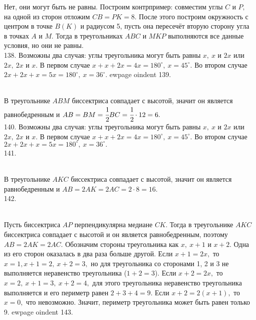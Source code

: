 Нет, они могут быть не равны. Построим контрпример: совместим углы $C$ и $P,$ на одной из сторон отложим $CB=PK=8.$ После этого построим окружность с центром в точке $B(K)$ и радиусом 5, пусть она пересечёт вторую сторону угла в точках $A$ и $M.$ Тогда в треугольниках $ABC$ и $MKP$ выполняются все данные условия, но они не равны.\\
138. Возможны два случая: углы треугольника могут быть равны $x,\ x$ и $2x$ или $2x,\ 2x$ и $x.$ В первом случае $x+x+2x=4x=180^\circ,\ x=45^\circ.$ Во втором случае $2x+2x+x=5x=180^\circ,\ x=36^\circ.$
ewpage
oindent
139. \begin{figure}[ht!]
\end{figure}\\
В треугольнике $ABM$ биссектриса совпадает с высотой, значит он является равнобедренным и $AB=BM=\cfrac{1}{2}BC=\cfrac{1}{2}\cdot12=6.$\\
140. Возможны два случая: углы треугольника могут быть равны $x,\ x$ и $2x$ или $2x,\ 2x$ и $x.$ В первом случае $x+x+2x=4x=180^\circ,\ x=45^\circ.$ Во втором случае $2x+2x+x=5x=180^\circ,\ x=36^\circ.$\\
141. \begin{figure}[ht!]
\end{figure}\\
В треугольнике $AKC$ биссектриса совпадает с высотой, значит он является равнобедренным и $AB=2AK=2AC=2\cdot8=16.$\\
142. \begin{figure}[ht!]
\end{figure}\\
Пусть биссектриса $AP$ перпендикулярна медиане $CK.$ Тогда в треугольнике $AKC$ биссектриса совпадает с высотой и он является равнобедренным, поэтому $AB=2AK=2AC.$ Обозначим стороны треугольника как $x,\ x+1$ и $x+2.$ Одна из его сторон оказалась в два раза больше другой. Если $x+1=2x,$ то $x=1, x+1=2,\ x+2=3,$ но для треугольника со сторонами 1, 2 и 3 не выполняется неравенство треугольника ($1+2=3$). Если $x+2=2x,$ то $x=2,\ x+1=3,\ x+2=4,$ для этого треугольника неравенство треугольника выполняется и его периметр равен $2+3+4=9.$ Если $x+2=2(x+1),$ то $x=0,$ что невозможно. Значит, периметр треугольника может быть равен только 9.
ewpage
oindent
143. \begin{figure}[ht!]
\end{figure}\\
